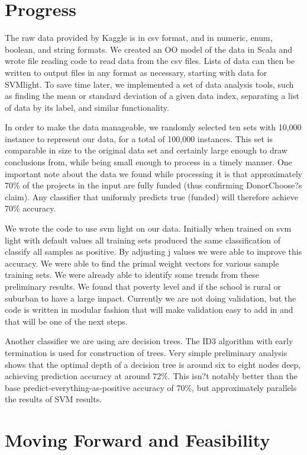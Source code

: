 \documentclass{article}
\begin{document}
\section{Progress}
The raw data provided by Kaggle is in csv format, and in numeric, enum, boolean, and string formats. We created an OO model of the data in Scala and wrote file reading code to read data from the csv files. Lists of data can then be written to output files in any format as necessary, starting with data for SVMlight. To save time later, we implemented a set of data analysis tools, such as finding the mean or standard deviation of a given data index, separating a list of data by its label, and similar functionality.

In order to make the data manageable, we randomly selected ten sets with 10,000 instance to represent our data, for a total of 100,000 instances. This set is comparable in size to the original data set and certainly large enough to draw conclusions from, while being small enough to process in a timely manner. One important note about the data we found while processing it is that approximately 70\% of the projects in the input are fully funded (thus confirming DonorChoose?s claim). Any classifier that uniformly predicts true (funded) will therefore achieve 70\% accuracy.

We wrote the code to use svm light on our data.  Initially when trained on svm light with default values all training sets produced the same classification of classify all samples as positive.  By adjusting j values we were able to improve this accuracy.
We were able to find the primal weight vectors for various sample training sets.  We were already able to identify some trends from these preliminary results.  We found that poverty level and if the school is rural or suburban to have a large impact.  Currently we are not doing validation, but the code is written in modular fashion that will make validation easy to add in and that will be one of the next steps. 

Another classifier we are using are decision trees. The ID3 algorithm with early termination is used for construction of trees. Very simple preliminary analysis shows that the optimal depth of a decision tree is around six to eight nodes deep, achieving prediction accuracy at around 72\%. This isn?t notably better than the base predict-everything-as-positive accuracy of 70\%, but approximately parallels the results of SVM results.

\section{Moving Forward and Feasibility}
\end{document}
